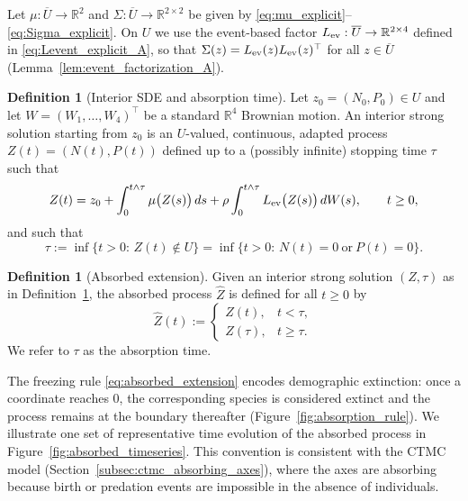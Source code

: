 \documentclass[pdflatex,sn-mathphys-ay]{sn-jnl}
\theoremstyle{thmstyleone}
\theoremstyle{definition}
\newtheorem{definition}[theorem]{Definition}
\theoremstyle{remark}
\begin{document}
Let $\mu:\overline U\to\mathbb{R}^2$ and $\Sigma:\overline U\to\mathbb{R}^{2\times 2}$ be given by
\eqref{eq:mu_explicit}--\eqref{eq:Sigma_explicit}.
On $U$ we use the event-based factor $L_{\rm ev}:\overline U\to\mathbb{R}^{2\times 4}$ defined in
\eqref{eq:Levent_explicit_A}, so that $\Sigma(z)=L_{\rm ev}(z)L_{\rm ev}(z)^\top$ for all $z\in\overline U$
(Lemma~\ref{lem:event_factorization_A}).

\begin{definition}[Interior SDE and absorption time]\label{def:interior_SDE_tau}
Let $z_0=(N_0,P_0)\in U$ and let $W=(W_1,\dots,W_4)^\top$ be a standard $\mathbb{R}^4$ Brownian motion.
An interior strong solution starting from $z_0$ is an $U$-valued, continuous, adapted process
$Z(t)=(N(t),P(t))$ defined up to a (possibly infinite) stopping time $\tau$ such that
\begin{equation}\label{eq:interior_SDE}
Z(t)=z_0+\int_0^{t\wedge\tau}\mu\bigl(Z(s)\bigr)\,ds
+\rho\int_0^{t\wedge\tau} L_{\rm ev}\bigl(Z(s)\bigr)\,dW(s),
\qquad t\ge0,
\end{equation}
and such that
\begin{equation}\label{eq:tau_def_A}
\tau:=\inf\{t>0:\, Z(t)\notin U\}
=\inf\{t>0:\, N(t)=0 \ \text{or}\ P(t)=0\}.
\end{equation}
\end{definition}

\begin{definition}[Absorbed extension]\label{def:absorbed_process}
Given an interior strong solution $(Z,\tau)$ as in Definition~\ref{def:interior_SDE_tau},
the absorbed process $\widehat Z$ is defined for all $t\ge0$ by
\begin{equation}\label{eq:absorbed_extension}
\widehat Z(t):=
\begin{cases}
Z(t), & t<\tau,\\
Z(\tau), & t\ge \tau.
\end{cases}
\end{equation}
We refer to $\tau$ as the absorption time.
\end{definition}

The freezing rule \eqref{eq:absorbed_extension} encodes demographic extinction: once a coordinate reaches $0$, the
corresponding species is considered extinct and the process remains at the boundary thereafter (Figure~\ref{fig:absorption_rule}). We illustrate one set of representative time evolution of the absorbed process in Figure~\ref{fig:absorbed_timeseries}. This convention is
consistent with the CTMC model (Section~\ref{subsec:ctmc_absorbing_axes}), where the axes are absorbing because
birth or predation events are impossible in the absence of individuals.
\end{document}
